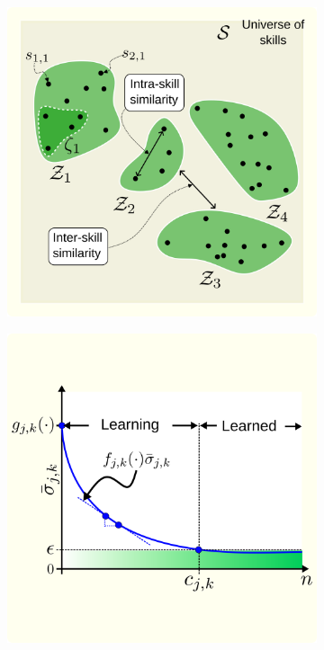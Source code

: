 \documentclass[12pt]{article}
\begin{document}
\begin{figure}[!t]
	\centering
	\hspace*{\fill}
	\begin{subfigure}[t]{7.5cm}
		\subcaption{}
		\includegraphics[width=\textwidth]{skill_similarity.png} \label{fig:skill_similarity}
	\end{subfigure}
	\hfill
	\begin{subfigure}[t]{7.5cm}	
		\subcaption{}
		\includegraphics[width=\textwidth]{remaining_knowledge_dynamics_idealization.png} \label{fig:knowledge_idealization}

\end{subfigure}
\end{figure}
\end{document}
